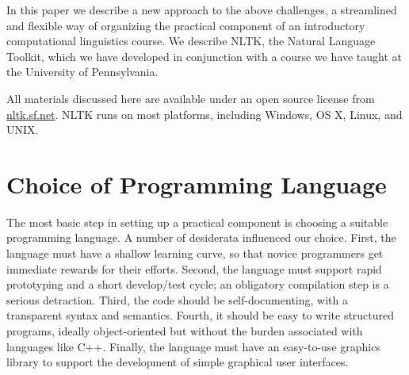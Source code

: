 \documentclass[11pt]{article}
\begin{document}
In this paper we describe a new approach to the above challenges, a
streamlined and flexible way of organizing the practical component of
an introductory computational linguistics course.  We describe NLTK,
the Natural Language Toolkit, which we have developed in conjunction
with a course we have taught at the University of Pennsylvania.


All materials discussed here are available under an open source
license from \url{nltk.sf.net}.  NLTK runs on most platforms,
including Windows, OS X, Linux, and UNIX.

\section{Choice of Programming Language}
\label{sec:python}

The most basic step in setting up a practical component is choosing a
suitable programming language.  A number of desiderata influenced our
choice.  First, the language must have a shallow learning curve, so
that novice programmers get immediate rewards for their efforts.
Second, the language must support rapid prototyping and a short
develop/test cycle; an obligatory compilation step is a serious
detraction.  Third, the code should be self-documenting, with a
transparent syntax and semantics.  Fourth, it should be easy to write
structured programs, ideally object-oriented but without the burden
associated with languages like C++.  Finally, the language must have
an easy-to-use graphics library to support the development of simple
graphical user interfaces.
\end{document}
